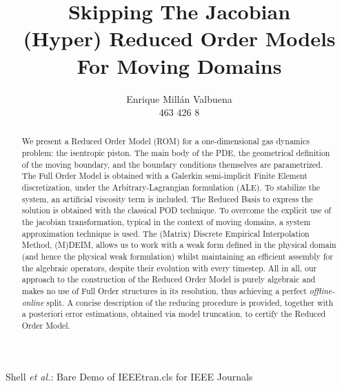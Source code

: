 \documentclass[a4paper, technote,compsoc]{IEEEtran}
\begin{document}
\onecolumn

\title{Skipping The Jacobian \\[5mm] \large{(Hyper) Reduced Order Models For Moving Domains}}

\author{Enrique Millán Valbuena \\ \normalsize{463 426 8}}%
        
{Shell \MakeLowercase{\textit{et al.}}: Bare Demo of IEEEtran.cls for IEEE Journals}

\maketitle

\begin{abstract}
   We present a Reduced Order Model (ROM) for a one-dimensional gas dynamics problem:
   the isentropic piston.
   The main body of the PDE, 
   the geometrical definition of the moving boundary, 
   and the boundary conditions themselves are parametrized.
   The Full Order Model is obtained with a Galerkin semi-implicit Finite Element discretization,
   under the Arbitrary-Lagrangian formulation (ALE).
   To stabilize the system, an artificial viscosity term is included.
   The Reduced Basis to express the solution is obtained with the classical POD technique.
   To overcome the explicit use of the jacobian transformation, 
   typical in the context of moving domains,
   a system approximation technique is used.
   The (Matrix) Discrete Empirical Interpolation Method, (M)DEIM, allows us
   to work with a weak form defined in the physical domain (and hence the physical weak formulation)
   whilst maintaining an
   efficient assembly for the algebraic operators, 
   despite their evolution with every timestep.
   All in all, our approach to the construction of the Reduced Order Model is purely algebraic
   and makes no use of Full Order structures in its resolution, 
   thus achieving a perfect \textit{offline-online} split.
   A concise description of the reducing procedure is provided, 
   together with a posteriori error estimations, obtained via model truncation,
   to certify the Reduced Order Model.
\end{abstract}
\end{document}
